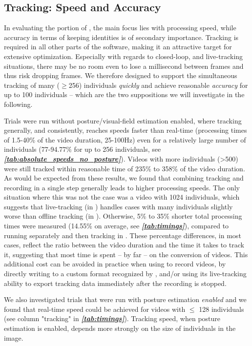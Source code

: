 \documentclass[9pt,lineno]{elife}
\newcommand{\tableref}[1]{\textit{\textbf{\ref{tab:#1}}}\xspace}
\newcommand{\TRex}{\protect\path{TRex}}
\newcommand{\TGrabs}{\protect\path{TGrabs}}
\begin{document}
\subsection{Tracking: Speed and Accuracy}

In evaluating the  portion of \TRex{}, the main focus lies with processing speed, while accuracy in terms of keeping identities is of secondary importance. Tracking is required in all other parts of the software, making it an attractive target for extensive optimization. Especially with regards to closed-loop, and live-tracking situations, there may be no room even to lose a millisecond between frames and thus risk dropping frames. We therefore designed \TRex{} to support the simultaneous tracking of many ($\geq$256) individuals \textit{quickly} and achieve reasonable \textit{accuracy} for up to 100 individuals -- which are the two suppositions we will investigate in the following.

Trials were run without posture/visual-field estimation enabled, where tracking generally, and consistently, reaches speeds faster than real-time (processing times of 1.5-40\% of the video duration, 25-100Hz) even for a relatively large number of individuals (77-94.77\% for up to 256 individuals, see \tableref{absolute_speeds_no_posture}). Videos with more individuals (>500) were still tracked within reasonable time of 235\% to 358\% of the video duration. As would be expected from these results, we found that combining tracking and recording in a single step generally leads to higher processing speeds. The only situation where this was not the case was a video with 1024 individuals, which suggests that live-tracking (in \TGrabs{}) handles cases with many individuals slightly worse than offline tracking (in \TRex{}). Otherwise, 5\% to 35\% shorter total processing times were measured (14.55\% on average, see \tableref{timings}), compared to running \TGrabs{} separately and then tracking in \TRex{}. These percentage differences, in most cases, reflect the ratio between the video duration and the time it takes to track it, suggesting that most time is spent -- by far -- on the conversion of videos. This additional cost can be avoided in practice when using \TGrabs{} to record videos, by directly writing to a custom format recognized by \TRex{}, and/or using its live-tracking ability to export tracking data immediately after the recording is stopped.

We also investigated trials that were run with posture estimation \textit{enabled} and we found that real-time speed could be achieved for videos with $\leq$ 128 individuals (see column "tracking" in \tableref{timings}). Tracking speed, when posture estimation is enabled, depends more strongly on the size of individuals in the image.
\end{document}
